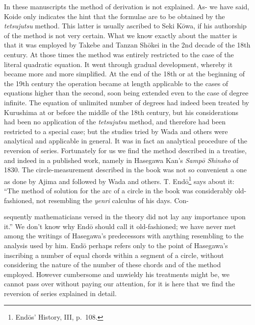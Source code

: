 \documentclass[11pt]{article}
\newcommand{\scanpage}[2]{\clearpage\setcounter{footnote}{0}\noindent{\footnotesize\color{gray}PDF page #1 · #2}\par\medskip}
\begin{document}
In these manuscripts the method of derivation is not explained. As- we have said, Koide only indicates the hint that the formulae are to be obtained by the \emph{tetsujutsu} method. This latter is usually ascribed to Seki Kōwa, if his authorship of the method is not very certain. What we know exactly about the matter is that it was employed by Takebe and Tanzan Shōkei in the 2nd decade of the 18th century. At those times the method was entirely restricted to the case of the literal quadratic equation. It went through gradual development, whereby it became more and more simplified. At the end of the 18th or at the beginning of the 19th century the operation became at length applicable to the cases of equations higher than the second, soon being extended even to the case of degree infinite. The equation of unlimited number of degrees had indeed been treated by Kurushima at or before the middle of the 18th century, but his considerations had been no application of the \emph{tetsujutsu} method, and therefore had been restricted to a special case; but the studies tried by Wada and others were analytical and applicable in general. It was in fact an analytical procedure of the reversion of series. Fortunately for us we find the method described in a treatise, and indeed in a published work, namely in Hasegawa Kan's \emph{Sampō Shinsho} of 1830. The circle-measurement described in the book was not so convenient a one as done by Ajima and followed by Wada and others. T. Endō\footnote{Endōs' History, III, p.~108.} says about it: ``The method of solution for the arc of a circle in the book was considerably old-fashioned, not resembling the \emph{yenri} calculus of his days. Con-

\scanpage{0293}{printed page 279}
sequently mathematicians versed in the theory did not lay any importance upon it.'' We don't know why Endō should call it old-fashioned; we have never met among the writings of Hasegawa's predecessors with anything resembling to the analysis used by him. Endō perhaps refers only to the point of Hasegawa's inscribing a number of equal chords within a segment of a circle, without considering the nature of the number of these chords and of the method employed. However cumbersome and unwieldy his treatments might be, we cannot pass over without paying our attention, for it is here that we find the reversion of series explained in detail.
\end{document}
